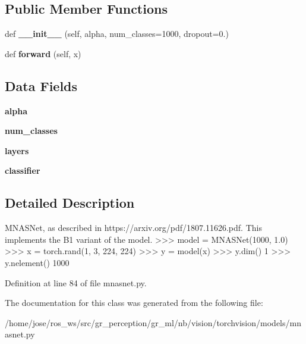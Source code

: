 \subsection*{Public Member Functions}
\begin{DoxyCompactItemize}
\item 
\mbox{\label{classtorchvision_1_1models_1_1mnasnet_1_1MNASNet_a2e2e1b23acdec3e10e0385a8cf5976c5}} 
def {\bfseries \+\_\+\+\_\+init\+\_\+\+\_\+} (self, alpha, num\+\_\+classes=1000, dropout=0.)
\item 
\mbox{\label{classtorchvision_1_1models_1_1mnasnet_1_1MNASNet_a202d9d10117371c1671aa50c36a64e75}} 
def {\bfseries forward} (self, x)
\end{DoxyCompactItemize}
\subsection*{Data Fields}
\begin{DoxyCompactItemize}
\item 
\mbox{\label{classtorchvision_1_1models_1_1mnasnet_1_1MNASNet_aa52b38618cbc6528a7ad361e5801ea24}} 
{\bfseries alpha}
\item 
\mbox{\label{classtorchvision_1_1models_1_1mnasnet_1_1MNASNet_a3a65ea0958010eb62198448ffd479106}} 
{\bfseries num\+\_\+classes}
\item 
\mbox{\label{classtorchvision_1_1models_1_1mnasnet_1_1MNASNet_aaabbf267f0ef4e1b4b864fb28b264adc}} 
{\bfseries layers}
\item 
\mbox{\label{classtorchvision_1_1models_1_1mnasnet_1_1MNASNet_a8057808bf69c94f1aa88148c2418ddc0}} 
{\bfseries classifier}
\end{DoxyCompactItemize}


\subsection{Detailed Description}
\begin{DoxyVerb}MNASNet, as described in https://arxiv.org/pdf/1807.11626.pdf. This
implements the B1 variant of the model.
>>> model = MNASNet(1000, 1.0)
>>> x = torch.rand(1, 3, 224, 224)
>>> y = model(x)
>>> y.dim()
1
>>> y.nelement()
1000
\end{DoxyVerb}
 

Definition at line 84 of file mnasnet.\+py.



The documentation for this class was generated from the following file\+:\begin{DoxyCompactItemize}
\item 
/home/jose/ros\+\_\+ws/src/gr\+\_\+perception/gr\+\_\+ml/nb/vision/torchvision/models/mnasnet.\+py\end{DoxyCompactItemize}
